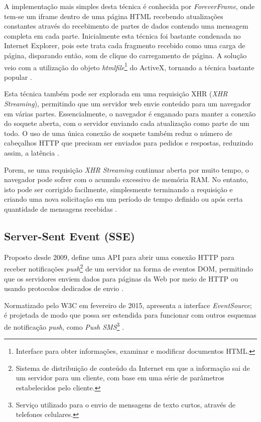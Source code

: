 A implementação mais simples desta técnica é conhecida por \emph{ForeverFrame}, onde tem-se um iframe dentro de uma página HTML recebendo atualizações constantes através do recebimento de partes de dados contendo uma mensagem completa em cada parte. Inicialmente esta técnica foi bastante condenada no Internet Explorer, pois este trata cada fragmento recebido como uma carga de página, disparando então, som de clique do carregamento de página. A solução veio com a utilização do objeto \emph{htmlfile}\footnote{Interface para obter informações, examinar e modificar documentos HTML.} do ActiveX, tornando a técnica bastante popular \cite{souders2009even}.

Esta técnica também pode ser explorada em uma requisição XHR (\emph{XHR Streaming}), permitindo que um servidor web envie conteúdo para um navegador em várias partes. Essencialmente, o navegador é enganado para manter a conexão do soquete aberta, com o servidor enviando cada atualização como parte de um todo. O uso de uma única conexão de soquete também reduz o número de cabeçalhos HTTP que precisam ser enviados para pedidos e respostas, reduzindo assim, a latência \cite{gutwin2011real}.

Porem, se uma requisição \emph{XHR Streaming} continuar aberta por muito tempo, o navegador pode sofrer com o acumulo excessivo de memória RAM. No entanto, isto pode ser corrigido facilmente, simplesmente terminando a requisição e criando uma nova solicitação em um período de tempo definido ou após certa quantidade de mensagens recebidas \cite{souders2009even}.

\subsection{Server-Sent Event (SSE)}

Proposto desde 2009, define uma API para abrir uma conexão HTTP para receber notificações \emph{push}\footnote{Sistema de distribuição de conteúdo da Internet em que a informação sai de um servidor para um cliente, com base em uma série de parâmetros estabelecidos pelo cliente.} de um servidor na forma de eventos DOM, permitindo que os servidores enviem dados para páginas da Web por meio de HTTP ou usando protocolos dedicados de envio \cite{hicksonserver2015}.

Normatizado pelo W3C em fevereiro de 2015, apresenta a interface \emph{EventSource}; é projetada de modo que possa ser estendida para funcionar com outros esquemas de notificação \emph{push}, como \emph{Push SMS}\footnote{Serviço utilizado para o envio de mensagens de texto curtos, através de telefones celulares.} \cite{hicksonserver2015}.

